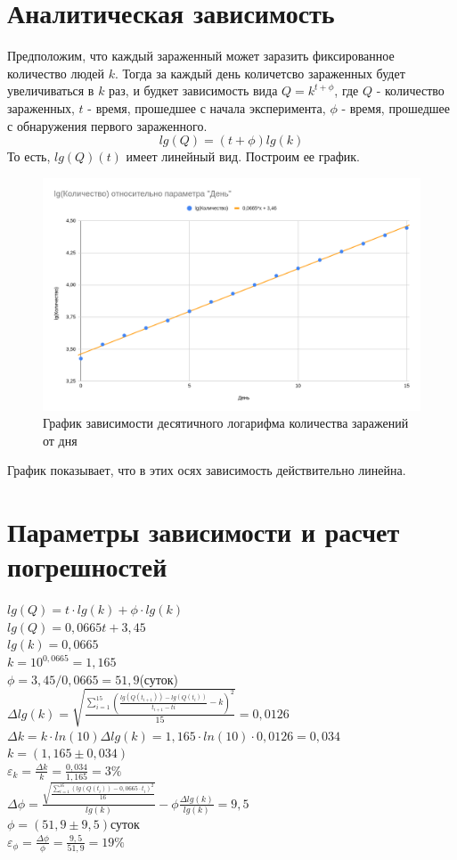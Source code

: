 \documentclass[12pt]{article}
\begin{document}
	\section{Аналитическая зависимость}
	Предположим, что каждый зараженный может заразить фиксированное количество людей $k$. Тогда за каждый день количетсво зараженных будет увеличиваться в $k$ раз, и будкет зависимость вида $Q=k^{t+\phi}$, где $Q$ - количество зараженных, $t$ - время, прошедшее с начала эксперимента, $\phi$ - время, прошедшее с обнаружения первого зараженного.
	$$lg(Q) = (t+\phi)lg(k)$$
	То есть, $lg(Q)(t)$ имеет линейный вид. Построим ее график.
	\begin{figure}[H]
		\centering
		\includegraphics[width=\linewidth]{pandemia_graph}
		\caption{График зависимости десятичного логарифма количества заражений от дня}
	\end{figure}
	График показывает, что в этих осях зависимость действительно линейна.
	\section{Параметры зависимости и расчет погрешностей}
	$lg(Q) = t\cdot lg(k) + \phi\cdot lg(k)$\\
	$lg(Q) = 0,0665t + 3,45$\\
	$lg(k) = 0,0665$\\
	$k = 10^{0,0665} = 1,165$\\
	$\phi = 3,45 / 0,0665 = 51,9$(суток)\\
	$\displaystyle\Delta lg(k)=\sqrt{\frac{\sum\limits^{15}_{i=1}(\frac{lg(Q(t_{i + 1})) - lg(Q(t_i))}{t_{i+1} - t{i}} - k)^2}{15}} = 0,0126$\\
	$\Delta k = k\cdot ln(10)\Delta lg(k) = 1,165\cdot ln(10)\cdot0,0126=0,034$\\
	$k=(1,165\pm0,034)$\\
	$\varepsilon_k = \frac{\Delta k}{k} = \frac{0,034}{1,165}=3\%$\\
	$\displaystyle\Delta\phi = \frac{\sqrt{\frac{\sum\limits_{i=1}^{16}(lg(Q(t_i)) - 0,0665\cdot t_i)^2}{16}}}{lg(k)} - \phi\frac{\Delta lg(k)}{lg(k)}=9,5$\\
	$\phi=(51,9\pm9,5)$суток\\
	$\varepsilon_\phi=\frac{\Delta\phi}{\phi}=\frac{9,5}{51,9}=19\%$\\
\end{document}
